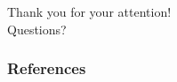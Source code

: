 \PraesentationMasterWeissBlau
\begin{frame}
    \begin{center}
        \huge Thank you for your attention! \\
        \vspace{1em}
        \large Questions?
    \end{center}
\end{frame}

\PraesentationMasterStandard
\begin{frame}[allowframebreaks]
    \frametitle{References}
    \printbibliography
\end{frame}

